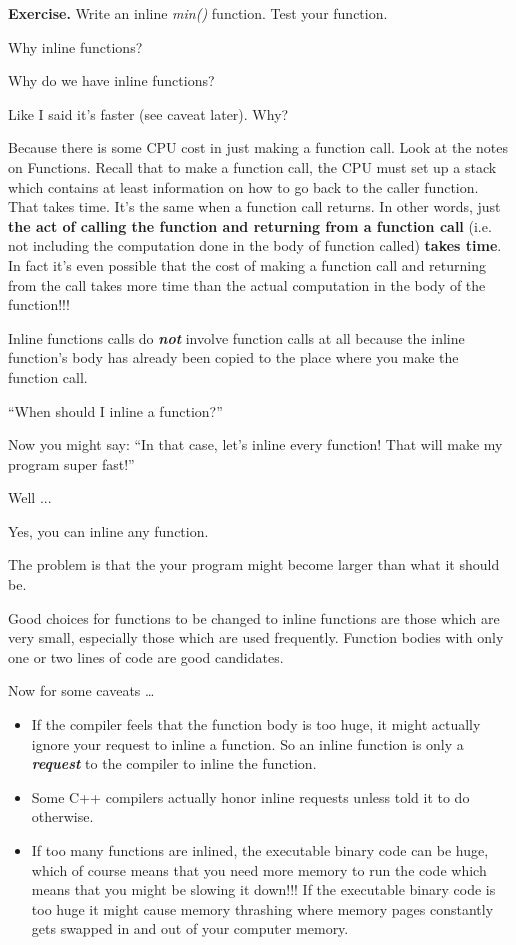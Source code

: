 \documentclass[
]{article}
\providecommand{\tightlist}{%
  \setlength{\itemsep}{0pt}\setlength{\parskip}{0pt}}
\begin{document}
\textbf{Exercise. }Write an inline \emph{min()} function. Test your
function.

Why inline functions?

Why do we have inline functions?

Like I said it's faster (see caveat later). Why?

Because there is some CPU cost in just making a function call. Look at
the notes on Functions. Recall that to make a function call, the CPU
must set up a stack which contains at least information on how to go
back to the caller function. That takes time. It's the same when a
function call returns. In other words, just \textbf{the act of calling
the function and returning from a function call} (i.e. not including the
computation done in the body of function called) \textbf{takes time}. In
fact it's even possible that the cost of making a function call and
returning from the call takes more time than the actual computation in
the body of the function!!!

Inline functions calls do \emph{\textbf{not}} involve function calls at
all because the inline function's body has already been copied to the
place where you make the function call.

``When should I inline a function?''

Now you might say: ``In that case, let's inline every function! That
will make my program super fast!''

Well ...

Yes, you can inline any function.

The problem is that the your program might become larger than what it
should be.

Good choices for functions to be changed to inline functions are those
which are very small, especially those which are used frequently.
Function bodies with only one or two lines of code are good candidates.

Now for some caveats \ldots{}

\begin{itemize}
\tightlist
\item
  If the compiler feels that the function body is too huge, it might
  actually ignore your request to inline a function. So an inline
  function is only a \emph{\textbf{request}} to the compiler to inline
  the function.
\item
  Some C++ compilers actually honor inline requests unless told it to do
  otherwise.
\item
  If too many functions are inlined, the executable binary code can be
  huge, which of course means that you need more memory to run the code
  which means that you might be slowing it down!!! If the executable
  binary code is too huge it might cause memory thrashing where memory
  pages constantly gets swapped in and out of your computer memory.
\end{itemize}
\end{document}
